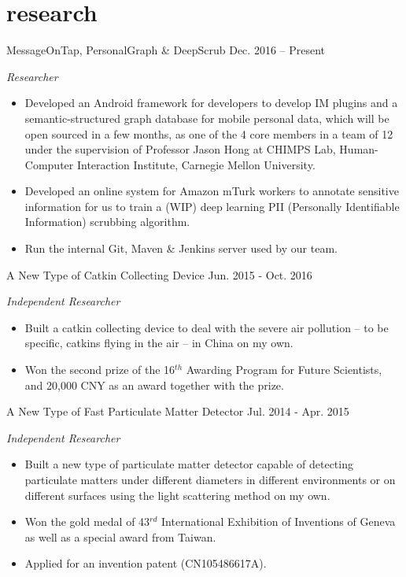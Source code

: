 \documentclass[]{adamyi-cv} %
\begin{document}
\section{research}

\begin{entrylist}


\entry
{MessageOnTap, PersonalGraph \& DeepScrub}
{Dec. 2016 -- Present}
{\emph{Researcher}
\begin{itemize}
\item Developed an Android framework for developers to develop IM plugins and a semantic-structured graph database for mobile personal data, which will be open sourced in a few months, as one of the 4 core members in a team of 12 under the supervision of Professor Jason Hong at CHIMPS Lab, Human-Computer Interaction Institute, Carnegie Mellon University.
\item Developed an online system for Amazon mTurk workers to annotate sensitive information for us to train a (WIP) deep learning PII (Personally Identifiable Information) scrubbing algorithm.
\item Run the internal Git, Maven \& Jenkins server used by our team.
\end{itemize}}


\entry
{A New Type of Catkin Collecting Device}
{Jun. 2015 - Oct. 2016}
{\emph{Independent Researcher}
\begin{itemize}
\item Built a catkin collecting device to deal with the severe air pollution – to be specific, catkins flying in the air – in China on my own.
\item Won the second prize of the 16$^{th}$ Awarding Program for Future Scientists, and 20,000 CNY as an award together with the prize.
\end{itemize}}


\entry
{A New Type of Fast Particulate Matter Detector}
{Jul. 2014 - Apr. 2015}
{\emph{Independent Researcher}
\begin{itemize}
\item Built a new type of particulate matter detector capable of detecting particulate matters under different diameters in different environments or on different surfaces using the light scattering method on my own.
\item Won the gold medal of 43$^{rd}$ International Exhibition of Inventions of Geneva as well as a special award from Taiwan.
\item Applied for an invention patent (CN105486617A).
\end{itemize}}


\end{entrylist}
\end{document}
